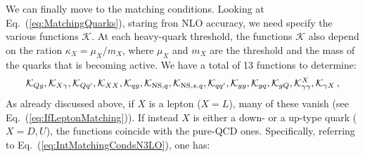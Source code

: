 \documentclass[10pt,a4paper]{article}
\begin{document}
We can finally move to the matching conditions. Looking at
Eq.~(\ref{eq:MatchingQuarks}), staring fron NLO accuracy, we need
specify the various functions $\mathcal{K}$. At each heavy-quark
threshold, the functions $\mathcal{K}$ also depend on the ration
$\kappa_X=\mu_X/m_X$, where $\mu_X$ and $m_X$ are the threshold and
the mass of the quarks that is becoming active. We have a total of 13
functions to determine:
\begin{equation}
\mathcal{K}_{Qg},\mathcal{K}_{X\gamma},\mathcal{K}_{Qq'},\mathcal{K}_{XX},\mathcal{K}_{qg},\mathcal{K}_{{\rm NS},q},\mathcal{K}_{{\rm NS},s,q},\mathcal{K}_{qq'},\mathcal{K}_{gg},\mathcal{K}_{gq},\mathcal{K}_{gQ},\mathcal{K}_{\gamma\gamma}^X,\mathcal{K}_{\gamma X}\,,
\end{equation}
As already discussed above, if $X$ is a lepton ($X=L$), many of these
vanish (see Eq.~(\ref{eq:IfLeptonMatching})). If instead $X$ is either
a down- or a up-type quark ($X=D,U$), the functions coincide with the
pure-QCD ones. Specifically, referring to
Eq.~(\ref{eq:IntMatchingCondsN3LO}), one has:
\end{document}
